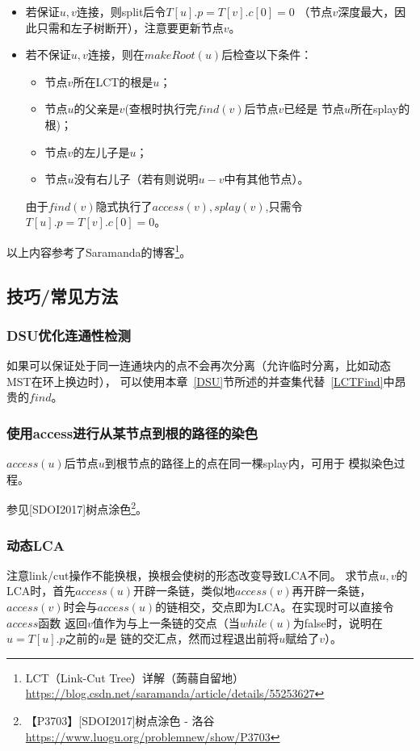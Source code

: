 \begin{itemize}
    \item 若保证$u,v$连接，则split后令$T[u].p=T[v].c[0]=0$
    （节点$v$深度最大，因此只需和左子树断开），注意要更新节点$v$。
    \item 若不保证$u,v$连接，则在$makeRoot(u)$后检查以下条件：
    \begin{itemize}
        \item 节点$v$所在LCT的根是$u$；
        \item 节点$u$的父亲是$v$(查根时执行完$find(v)$后节点$v$已经是
        节点$u$所在splay的根)；
        \item 节点$v$的左儿子是$u$；
        \item 节点$u$没有右儿子（若有则说明$u-v$中有其他节点）。
    \end{itemize}
    由于$find(v)$隐式执行了$access(v),splay(v)$,只需令
    $T[u].p=T[v].c[0]=0$。
\end{itemize}

以上内容参考了Saramanda的博客\footnote{
    LCT（Link-Cut Tree）详解（蒟蒻自留地）
    \url{https://blog.csdn.net/saramanda/article/details/55253627}}。

\subsection{技巧/常见方法}
\subsubsection{DSU优化连通性检测}
如果可以保证处于同一连通块内的点不会再次分离（允许临时分离，比如动态MST在环上换边时），
可以使用本章~\ref{DSU}节所述的并查集代替~\ref{LCTFind}中昂贵的$find$。
\subsubsection{使用access进行从某节点到根的路径的染色}
$access(u)$后节点$u$到根节点的路径上的点在同一棵splay内，可用于
模拟染色过程。

参见[SDOI2017]树点涂色\footnote{【P3703】[SDOI2017]树点涂色 - 洛谷
    \url{https://www.luogu.org/problemnew/show/P3703}}。
\subsubsection{动态LCA}
注意link/cut操作不能换根，换根会使树的形态改变导致LCA不同。
求节点$u,v$的LCA时，首先$access(u)$开辟一条链，类似地$access(v)$再开辟一条链，
$access(v)$时会与$access(u)$的链相交，交点即为LCA。在实现时可以直接令$access$函数
返回$v$值作为与上一条链的交点（当$while(u)$为false时，说明在$u=T[u].p$之前的$u$是
链的交汇点，然而过程退出前将$u$赋给了$v$）。

